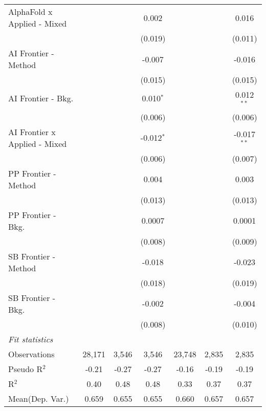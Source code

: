 \begin{tabular}{lcccccc}
   AlphaFold x Applied - Mixed   &              &              & 0.002        &                &              & 0.016\\   
                                 &              &              & (0.019)      &                &              & (0.011)\\   
   AI Frontier - Method          &              &              & -0.007       &                &              & -0.016\\   
                                 &              &              & (0.015)      &                &              & (0.015)\\   
   AI Frontier - Bkg.            &              &              & 0.010$^{*}$  &                &              & 0.012$^{**}$\\   
                                 &              &              & (0.006)      &                &              & (0.006)\\   
   AI Frontier x Applied - Mixed &              &              & -0.012$^{*}$ &                &              & -0.017$^{**}$\\   
                                 &              &              & (0.006)      &                &              & (0.007)\\   
   PP Frontier - Method          &              &              & 0.004        &                &              & 0.003\\   
                                 &              &              & (0.013)      &                &              & (0.013)\\   
   PP Frontier - Bkg.            &              &              & 0.0007       &                &              & 0.0001\\   
                                 &              &              & (0.008)      &                &              & (0.009)\\   
   SB Frontier - Method          &              &              & -0.018       &                &              & -0.023\\   
                                 &              &              & (0.018)      &                &              & (0.019)\\   
   SB Frontier - Bkg.            &              &              & -0.002       &                &              & -0.004\\   
                                 &              &              & (0.008)      &                &              & (0.010)\\   
   \midrule
   \emph{Fit statistics}\\
   Observations                  & 28,171       & 3,546        & 3,546        & 23,748         & 2,835        & 2,835\\  
   Pseudo R$^2$                  & -0.21        & -0.27        & -0.27        & -0.16          & -0.19        & -0.19\\  
   R$^2$                         & 0.40         & 0.48         & 0.48         & 0.33           & 0.37         & 0.37\\  
Mean(Dep. Var.) & 0.659 & 0.655 & 0.655 & 0.660 & 0.657 & 0.657 \\
   

\end{tabular}
